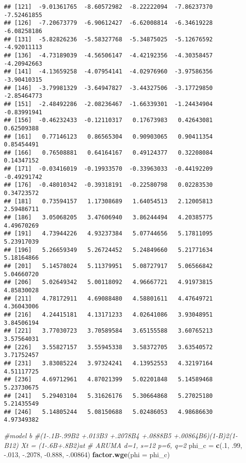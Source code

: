 \documentclass[]{article}
\newenvironment{Shaded}{\begin{snugshade}}{\end{snugshade}}
\newcommand{\CommentTok}[1]{\textcolor[rgb]{0.56,0.35,0.01}{\textit{#1}}}
\newcommand{\DataTypeTok}[1]{\textcolor[rgb]{0.13,0.29,0.53}{#1}}
\newcommand{\DecValTok}[1]{\textcolor[rgb]{0.00,0.00,0.81}{#1}}
\newcommand{\FloatTok}[1]{\textcolor[rgb]{0.00,0.00,0.81}{#1}}
\newcommand{\KeywordTok}[1]{\textcolor[rgb]{0.13,0.29,0.53}{\textbf{#1}}}
\newcommand{\NormalTok}[1]{#1}
\newcommand{\StringTok}[1]{\textcolor[rgb]{0.31,0.60,0.02}{#1}}
\begin{document}
\begin{verbatim}
## [121]  -9.01361765  -8.60572982  -8.22222094  -7.86237370  -7.52461855
## [126]  -7.20673779  -6.90612427  -6.62008814  -6.34619228  -6.08258186
## [131]  -5.82826236  -5.58327768  -5.34875025  -5.12676592  -4.92011113
## [136]  -4.73189039  -4.56506147  -4.42192356  -4.30358457  -4.20942663
## [141]  -4.13659258  -4.07954141  -4.02976960  -3.97586356  -3.90410315
## [146]  -3.79981329  -3.64947827  -3.44327506  -3.17729850  -2.85464773
## [151]  -2.48492286  -2.08236467  -1.66339301  -1.24434904  -0.83991941
## [156]  -0.46232433  -0.12110317   0.17673983   0.42643081   0.62509388
## [161]   0.77146123   0.86565304   0.90903065   0.90411354   0.85454491
## [166]   0.76508881   0.64164167   0.49124377   0.32208084   0.14347152
## [171]  -0.03416019  -0.19933570  -0.33963033  -0.44192209  -0.49291742
## [176]  -0.48010342  -0.39318191  -0.22580798   0.02283530   0.34723572
## [181]   0.73594157   1.17308689   1.64054513   2.12005813   2.59486711
## [186]   3.05068205   3.47606940   3.86244494   4.20385775   4.49670269
## [191]   4.73944226   4.93237384   5.07744656   5.17811095   5.23917039
## [196]   5.26659349   5.26724452   5.24849660   5.21771634   5.18164866
## [201]   5.14578024   5.11379951   5.08727917   5.06566842   5.04660720
## [206]   5.02649342   5.00118092   4.96667721   4.91973815   4.85830028
## [211]   4.78172911   4.69088480   4.58801611   4.47649721   4.36043006
## [216]   4.24415181   4.13171233   4.02641086   3.93048951   3.84506194
## [221]   3.77030723   3.70589584   3.65155588   3.60765213   3.57564031
## [226]   3.55827157   3.55945338   3.58372705   3.63540572   3.71752457
## [231]   3.83085224   3.97324241   4.13952553   4.32197164   4.51117725
## [236]   4.69712961   4.87021399   5.02201848   5.14589468   5.23730675
## [241]   5.29403104   5.31626176   5.30664868   5.27025180   5.21435549
## [246]   5.14805244   5.08150688   5.02486053   4.98686630   4.97349382
\end{verbatim}

\begin{Shaded}
\begin{Highlighting}[]
\CommentTok{#model b}
\CommentTok{#(1-.1B-.99B2 +.013B3 +.2078B4 +.0888B5 +.00864B6)(1-B)2(1-B12) Xt = (1-.6B+.8B2)at}
\CommentTok{# ARUMA d=1, s=12 p=6, q=2}
\NormalTok{phi_c =}\StringTok{ }\KeywordTok{c}\NormalTok{(.}\DecValTok{1}\NormalTok{, }\FloatTok{.99}\NormalTok{, }\FloatTok{-.013}\NormalTok{, }\FloatTok{-.2078}\NormalTok{, }\FloatTok{-0.888}\NormalTok{, }\FloatTok{-.00864}\NormalTok{)}
\KeywordTok{factor.wge}\NormalTok{(}\DataTypeTok{phi =}\NormalTok{ phi_c)}
\end{Highlighting}
\end{Shaded}
\end{document}
